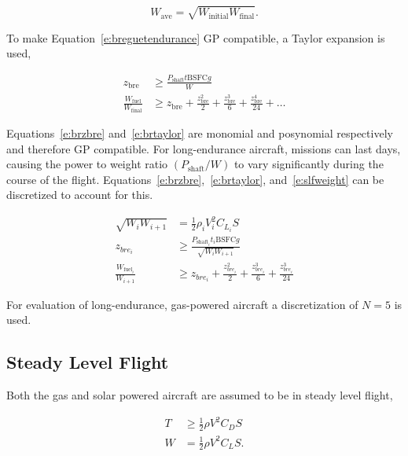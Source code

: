 \documentclass[]{aiaa-tc}%
\begin{document}
\begin{equation}
    \label{e:gpmean}
    W_{\text{ave}} = \sqrt{W_{\text{initial}}W_{\text{final}}}.
\end{equation}

    To make Equation~\eqref{e:breguetendurance} GP compatible, a Taylor expansion is used,\cite{hoburgthesis}

\begin{align}
    \label{e:brzbre}
    z_{\text{bre}} &\geq \frac{P_{\text{shaft}}t \text{BSFC} g}{W}\\
    \label{e:brtaylor}
    \frac{W_{\text{fuel}}}{W_\text{final}} &\geq z_{\text{bre}} + \frac{z_{\text{bre}}^2}{2} + \frac{z_{\text{bre}}^3}{6} + \frac{z_{\text{bre}}^4}{24} + \dots
\end{align}

    Equations~\eqref{e:brzbre} and~\eqref{e:brtaylor} are monomial and posynomial respectively and therefore GP compatible. For long-endurance aircraft, missions can last days, causing the power to weight ratio $(P_{\text{shaft}}/W)$ to vary significantly during the course of the flight.  
    Equations~\eqref{e:brzbre},~\eqref{e:brtaylor}, and~\eqref{e:slfweight} can be discretized to account for this.

\begin{align}
    \label{e:slfweightd}
    \sqrt{W_i W_{i+1}} &= \frac{1}{2} \rho_i V_i^2 C_{L_i} S \\
    \label{e:brzbred}
    z_{bre_i} &\geq \frac{P_{\text{shaft}_i}t_i \text{BSFC} g}{\sqrt{W_i W_{i+1}}}\\
    \label{e:brtaylord}
    \frac{W_{\text{fuel}_i}}{W_{i+1}} &\geq z_{bre_i} + \frac{z_{bre_i}^2}{2} + \frac{z_{bre_i}^3}{6} + \frac{z_{bre_i}^3}{24} 
    \end{align}

    For evaluation of long-endurance, gas-powered aircraft a discretization of $N=5$ is used. 

\subsection{Steady Level Flight}

Both the gas and solar powered aircraft are assumed to be in steady level flight,\cite{hoburgthesis}

\begin{align}
    \label{e:slfthrust}
    T &\geq \frac{1}{2} \rho V^2 C_D S\\
    \label{e:slfweight}
    W &= \frac{1}{2} \rho V^2 C_L S. 
\end{align}
\end{document}
